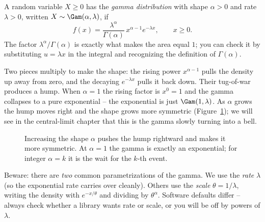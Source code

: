\begin{definition}
\label{ch11:def-gamma}
A random variable $X \ge 0$ has the \emph{gamma distribution} with shape
$\alpha > 0$ and rate $\lambda > 0$, written $X\sim\Gam(\alpha,\lambda)$, if
\[
  f(x) = \frac{\lambda^{\alpha}}{\Gamma(\alpha)}\,x^{\alpha-1} e^{-\lambda x},
  \qquad x \ge 0.
\]
The factor $\lambda^{\alpha}/\Gamma(\alpha)$ is exactly what makes the area
equal $1$; you can check it by substituting $u = \lambda x$ in the integral and
recognizing the definition of $\Gamma(\alpha)$.
\end{definition}

Two pieces multiply to make the shape: the rising power $x^{\alpha-1}$ pulls the
density up away from zero, and the decaying $e^{-\lambda x}$ pulls it back down.
Their tug-of-war produces a hump. When $\alpha = 1$ the rising factor is
$x^0 = 1$ and the gamma collapses to a pure exponential -- the exponential is
just $\Gam(1,\lambda)$. As $\alpha$ grows the hump moves right and the shape
grows more symmetric (Figure~\ref{ch11:fig-gamma}); we will see in the
central-limit chapter that this is the gamma slowly turning into a bell.

\begin{figure}[H]
\centering
{}
\caption{Increasing the shape $\alpha$ pushes the hump rightward and makes it
more symmetric. At $\alpha=1$ the gamma is exactly an exponential; for integer
$\alpha=k$ it is the wait for the $k$-th event.}
\label{ch11:fig-gamma}
\end{figure}

\begin{marginnotebox}
Beware: there are \emph{two} common parametrizations of the gamma. We use the
\emph{rate} $\lambda$ (so the exponential rate carries over cleanly). Others use
the \emph{scale} $\theta = 1/\lambda$, writing the density with $e^{-x/\theta}$
and dividing by $\theta^{\alpha}$. Software defaults differ -- always check
whether a library wants rate or scale, or you will be off by powers of
$\lambda$.
\end{marginnotebox}

